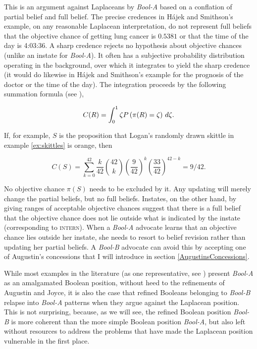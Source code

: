 \documentclass[11pt]{article}
\newcommand{\anderson}[0]{\textit{Bool-A}}
\newcommand{\augustin}[0]{\textit{Bool-B}}
\begin{document}
This is an argument against Laplaceans by {\anderson} based on a
conflation of partial belief and full belief. The precise credences in
H{\'a}jek and Smithson's example, on any reasonable Laplacean
interpretation, do not represent full beliefs that the objective
chance of getting lung cancer is $0.5381$ or that the time of the day
is 4:03:36. A sharp credence rejects no hypothesis about objective
chances (unlike an instate for {\anderson}). It often has a subjective
probability distribution operating in the background, over which it
integrates to yield the sharp credence (it would do likewise in
H{\'a}jek and Smithson's example for the prognosis of the doctor or
the time of the day). The integration proceeds by the
following summation formula (see ),

\begin{equation}
  \label{eq:s2}
  C(R)=\int_{0}^{1}\zeta{}P\left(\pi(R)=\zeta\right)\,d\zeta{}.\bcut{21}
\end{equation}

{\noindent}If, for example, $S$ is the proposition that Logan's
randomly drawn skittle in example \ref{ex:skittles} is orange, then

\begin{equation}
  \label{eq:skit}
  C(S)=\sum_{k=0}^{42}\frac{k}{42}\binom{42}{k}\left(\frac{9}{42}\right)^{k}\left(\frac{33}{42}\right)^{42-k}=9/42.
\end{equation}

No objective chance $\pi(S)$ needs to be excluded by it. Any updating
will merely change the partial beliefs, but no full beliefs. Instates,
on the other hand, by giving ranges of acceptable objective chances
suggest that there is a full belief that the objective chance does not
lie outside what is indicated by the instate (corresponding to
\textsc{intern}). When a {\anderson} advocate learns that an objective
chance lies outside her instate, she needs to resort to belief
revision rather than updating her partial beliefs. A {\augustin}
advocate can avoid this by accepting one of Augustin's concessions
that I will introduce in section \ref{AugustinsConcessions}.

While most examples in the literature (as one representative, see
) present {\anderson} as an amalgamated
Boolean position, without heed to the refinements of Augustin and
Joyce, it is also the case that refined Booleans belonging to
{\augustin} relapse into {\anderson} patterns when they argue against
the Laplacean position. This is not surprising, because, as we will
see, the refined Boolean position {\augustin} is more coherent than
the more simple Boolean position {\anderson}, but also left without
resources to address the problems that have made the Laplacean
position vulnerable in the first place.
\end{document}
